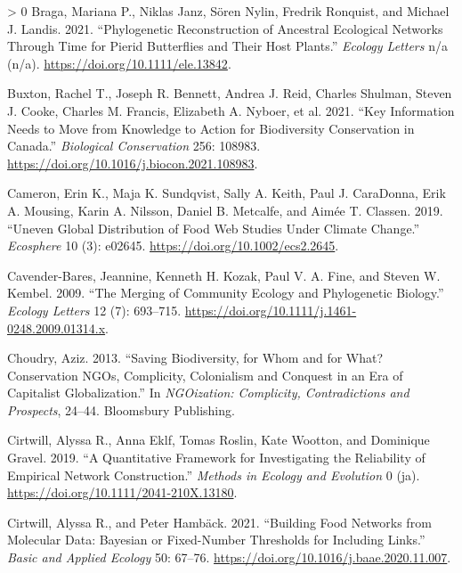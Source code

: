 \documentclass[10pt,oneside]{article}
\newlength{\cslhangindent}
\newenvironment{CSLReferences}[3] %
 {%
  \setlength{\parindent}{0pt}
  \ifodd #1 \everypar{\setlength{\hangindent}{\cslhangindent}}\ignorespaces\fi
  \ifnum #2 > 0
  \setlength{\parskip}{#2\baselineskip}
  \fi
 }%
 {}
\begin{document}
\begin{CSLReferences}{1}{0}
\leavevmode\hypertarget{ref-Braga2021PhyRec}{}%
Braga, Mariana P., Niklas Janz, Sören Nylin, Fredrik Ronquist, and
Michael J. Landis. 2021. {``Phylogenetic Reconstruction of Ancestral
Ecological Networks Through Time for Pierid Butterflies and Their Host
Plants.''} \emph{Ecology Letters} n/a (n/a).
\url{https://doi.org/10.1111/ele.13842}.

\leavevmode\hypertarget{ref-Buxton2021KeyInf}{}%
Buxton, Rachel T., Joseph R. Bennett, Andrea J. Reid, Charles Shulman,
Steven J. Cooke, Charles M. Francis, Elizabeth A. Nyboer, et al. 2021.
{``Key Information Needs to Move from Knowledge to Action for
Biodiversity Conservation in Canada.''} \emph{Biological Conservation}
256: 108983. \url{https://doi.org/10.1016/j.biocon.2021.108983}.

\leavevmode\hypertarget{ref-Cameron2019UneGlo}{}%
Cameron, Erin K., Maja K. Sundqvist, Sally A. Keith, Paul J. CaraDonna,
Erik A. Mousing, Karin A. Nilsson, Daniel B. Metcalfe, and Aimée T.
Classen. 2019. {``Uneven Global Distribution of Food Web Studies Under
Climate Change.''} \emph{Ecosphere} 10 (3): e02645.
\url{https://doi.org/10.1002/ecs2.2645}.

\leavevmode\hypertarget{ref-Cavender-Bares2009MerCom}{}%
Cavender-Bares, Jeannine, Kenneth H. Kozak, Paul V. A. Fine, and Steven
W. Kembel. 2009. {``The Merging of Community Ecology and Phylogenetic
Biology.''} \emph{Ecology Letters} 12 (7): 693--715.
\url{https://doi.org/10.1111/j.1461-0248.2009.01314.x}.

\leavevmode\hypertarget{ref-Choudry2013SavBio}{}%
Choudry, Aziz. 2013. {``Saving Biodiversity, for Whom and for What?
Conservation NGOs, Complicity, Colonialism and Conquest in an Era of
Capitalist Globalization.''} In \emph{NGOization: Complicity,
Contradictions and Prospects}, 24--44. Bloomsbury Publishing.

\leavevmode\hypertarget{ref-Cirtwill2019QuaFra}{}%
Cirtwill, Alyssa R., Anna Eklf, Tomas Roslin, Kate Wootton, and
Dominique Gravel. 2019. {``A Quantitative Framework for Investigating
the Reliability of Empirical Network Construction.''} \emph{Methods in
Ecology and Evolution} 0 (ja).
\url{https://doi.org/10.1111/2041-210X.13180}.

\leavevmode\hypertarget{ref-Cirtwill2021BuiFoo}{}%
Cirtwill, Alyssa R., and Peter Hambäck. 2021. {``Building Food Networks
from Molecular Data: Bayesian or Fixed-Number Thresholds for Including
Links.''} \emph{Basic and Applied Ecology} 50: 67--76.
\url{https://doi.org/10.1016/j.baae.2020.11.007}.


\end{CSLReferences}
\end{document}
